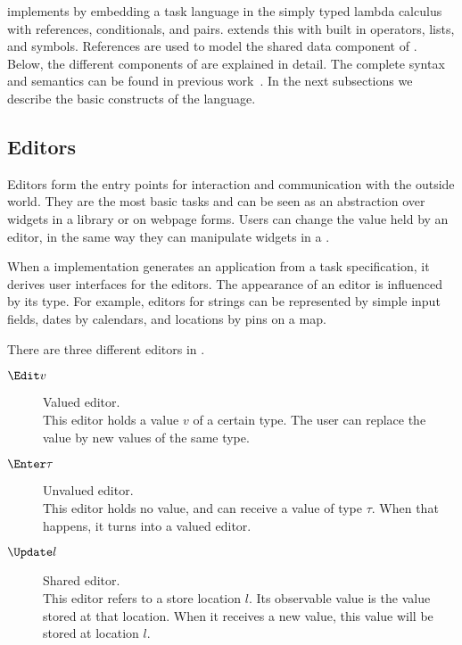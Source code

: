 \TOPHAT implements \TOP by embedding a task language in the simply typed lambda calculus with references, conditionals, and pairs.
\STOPHAT extends this with built in operators, lists, and symbols.
References are used to model the shared data component of \TOP.
Below, the different components of \TOPHAT are explained in detail.
The complete syntax and semantics can be found in previous work~\cite{Steenvoorden2019}.
In the next subsections we describe the basic constructs of the \TOPHAT language.

%
%

\subsection{Editors}

Editors form the entry points for interaction and communication with the outside world.
They are the most basic tasks and can be seen as an abstraction over widgets in a \GUI library or on webpage forms.
Users can change the value held by an editor, in the same way they can manipulate widgets in a \GUI.

When a \TOP implementation generates an application from a task specification, it derives user interfaces for the editors.
The appearance of an editor is influenced by its type.
For example, editors for strings can be represented by simple input fields, dates by calendars, and locations by pins on a map.

There are three different editors in \TOPHAT.
\begin{description}
  \item[$\Edit v$] Valued editor.\\
    This editor holds a value $v$ of a certain type.
    The user can replace the value by new values of the same type.
  \item[$\Enter \tau$] Unvalued editor.\\
    This editor holds no value, and can receive a value of type $\tau$.
    When that happens, it turns into a valued editor.
  \item[$\Update l$] Shared editor.\\
    This editor refers to a store location $l$.
    Its observable value is the value stored at that location.
    When it receives a new value, this value will be stored at location $l$.
\end{description}


